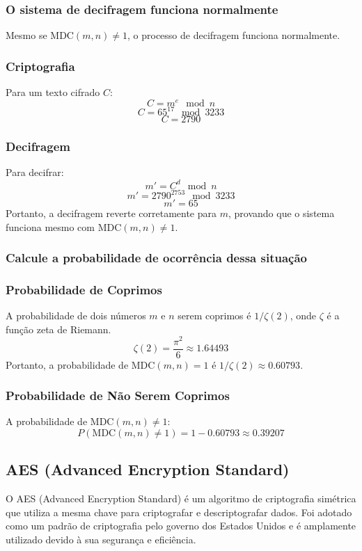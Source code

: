 \documentclass[a4paper,12pt]{article}
\begin{document}
\subsubsection*{O sistema de decifragem funciona normalmente}
Mesmo se \( \text{MDC}(m, n) \neq 1 \), o processo de decifragem funciona normalmente.

\subsubsection*{Criptografia}
Para um texto cifrado \( C \):
\[
C = m^e \mod n
\]
\[
C = 65^{17} \mod 3233
\]
\[
C = 2790
\]

\subsubsection*{Decifragem}
Para decifrar:
\[
m' = C^d \mod n
\]
\[
m' = 2790^{2753} \mod 3233
\]
\[
m' = 65
\]
Portanto, a decifragem reverte corretamente para \( m \), provando que o sistema funciona mesmo com \( \text{MDC}(m, n) \neq 1 \).

\subsubsection*{Calcule a probabilidade de ocorrência dessa situação}
\subsubsection*{Probabilidade de Coprimos}
A probabilidade de dois números \( m \) e \( n \) serem coprimos é \( 1/\zeta(2) \), onde \( \zeta \) é a função zeta de Riemann.
\[
\zeta(2) = \frac{\pi^2}{6} \approx 1.64493
\]
Portanto, a probabilidade de \( \text{MDC}(m, n) = 1 \) é \( 1/\zeta(2) \approx 0.60793 \).

\subsubsection*{Probabilidade de Não Serem Coprimos}
A probabilidade de \( \text{MDC}(m, n) \neq 1 \):
\[
P(\text{MDC}(m, n) \neq 1) = 1 - 0.60793 \approx 0.39207
\]

\subsection*{AES (Advanced Encryption Standard)}

O AES (Advanced Encryption Standard) é um algoritmo de criptografia simétrica que utiliza a mesma chave para criptografar e descriptografar dados. Foi adotado como um padrão de criptografia pelo governo dos Estados Unidos e é amplamente utilizado devido à sua segurança e eficiência.
\end{document}
